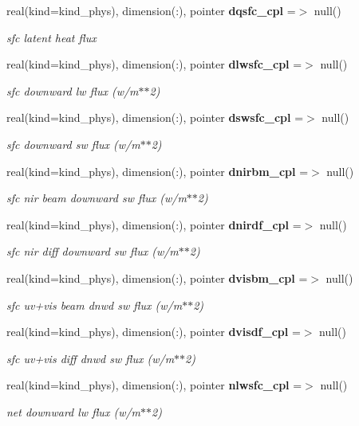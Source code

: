 \begin{DoxyCompactItemize}
real(kind=kind\+\_\+phys), dimension(\+:), pointer \textbf{ dqsfc\+\_\+cpl} =$>$ null()
\begin{DoxyCompactList}\small\item\em sfc latent heat flux \end{DoxyCompactList}\item 
real(kind=kind\+\_\+phys), dimension(\+:), pointer \textbf{ dlwsfc\+\_\+cpl} =$>$ null()
\begin{DoxyCompactList}\small\item\em sfc downward lw flux (w/m$\ast$$\ast$2) \end{DoxyCompactList}\item 
real(kind=kind\+\_\+phys), dimension(\+:), pointer \textbf{ dswsfc\+\_\+cpl} =$>$ null()
\begin{DoxyCompactList}\small\item\em sfc downward sw flux (w/m$\ast$$\ast$2) \end{DoxyCompactList}\item 
real(kind=kind\+\_\+phys), dimension(\+:), pointer \textbf{ dnirbm\+\_\+cpl} =$>$ null()
\begin{DoxyCompactList}\small\item\em sfc nir beam downward sw flux (w/m$\ast$$\ast$2) \end{DoxyCompactList}\item 
real(kind=kind\+\_\+phys), dimension(\+:), pointer \textbf{ dnirdf\+\_\+cpl} =$>$ null()
\begin{DoxyCompactList}\small\item\em sfc nir diff downward sw flux (w/m$\ast$$\ast$2) \end{DoxyCompactList}\item 
real(kind=kind\+\_\+phys), dimension(\+:), pointer \textbf{ dvisbm\+\_\+cpl} =$>$ null()
\begin{DoxyCompactList}\small\item\em sfc uv+vis beam dnwd sw flux (w/m$\ast$$\ast$2) \end{DoxyCompactList}\item 
real(kind=kind\+\_\+phys), dimension(\+:), pointer \textbf{ dvisdf\+\_\+cpl} =$>$ null()
\begin{DoxyCompactList}\small\item\em sfc uv+vis diff dnwd sw flux (w/m$\ast$$\ast$2) \end{DoxyCompactList}\item 
real(kind=kind\+\_\+phys), dimension(\+:), pointer \textbf{ nlwsfc\+\_\+cpl} =$>$ null()
\begin{DoxyCompactList}\small\item\em net downward lw flux (w/m$\ast$$\ast$2) \end{DoxyCompactList}\item 

\end{DoxyCompactItemize}
